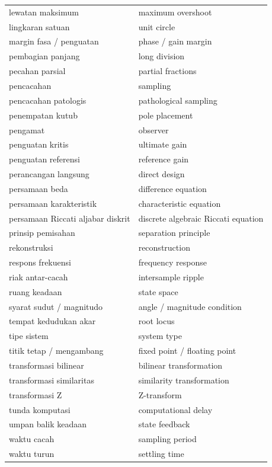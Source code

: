 \begin{center}
\begin{longtable}{@{}p{} p{}@{}}
		lewatan maksimum & maximum overshoot \\
		lingkaran satuan & unit circle \\
		margin fasa / penguatan & phase / gain margin \\
		pembagian panjang & long division \\
		pecahan parsial & partial fractions \\
		pencacahan & sampling \\
		pencacahan patologis & pathological sampling \\
		penempatan kutub & pole placement \\
		pengamat & observer \\
		penguatan kritis & ultimate gain \\
		penguatan referensi & reference gain \\
		perancangan langsung & direct design \\
		persamaan beda & difference equation \\
		persamaan karakteristik & characteristic equation \\
		persamaan Riccati aljabar diskrit & discrete algebraic Riccati equation \\
		prinsip pemisahan & separation principle \\
		rekonstruksi & reconstruction \\
		respons frekuensi & frequency response \\
		riak antar-cacah & intersample ripple \\
		ruang keadaan & state space \\
		syarat sudut / magnitudo & angle / magnitude condition \\
		tempat kedudukan akar & root locus \\
		tipe sistem & system type \\
		titik tetap / mengambang & fixed point / floating point \\
		transformasi bilinear & bilinear transformation \\
		transformasi similaritas & similarity transformation \\
		transformasi Z & Z-transform \\
		tunda komputasi & computational delay \\
		umpan balik keadaan & state feedback \\
		waktu cacah & sampling period \\
		waktu turun & settling time \\
		\bottomrule
	\end{longtable}
\end{center}
